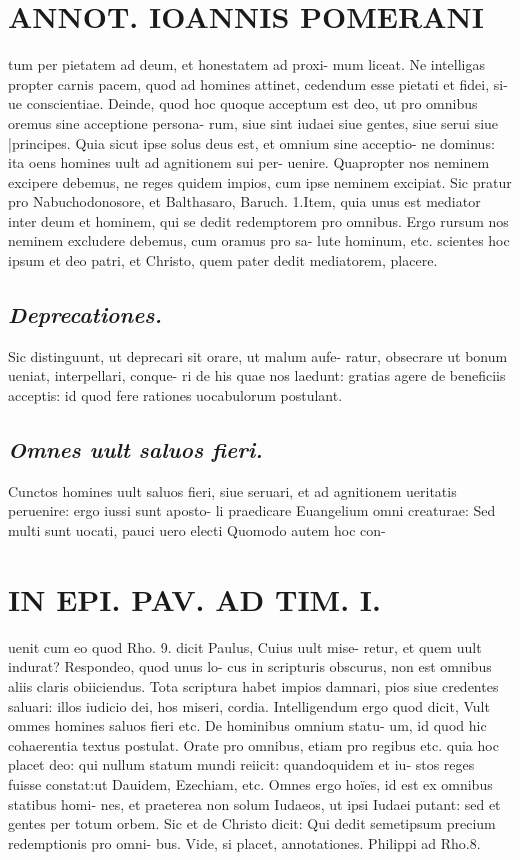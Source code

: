 \documentclass{article}
\begin{document}
\begin{pages}
\section*{ANNOT. IOANNIS POMERANI }\pstart tum per pietatem ad deum, et honestatem ad proxi- mum liceat. Ne intelligas propter carnis pacem, quod ad homines attinet, cedendum esse pietati et fidei, si- ue conscientiae. Deinde, quod hoc quoque  acceptum est deo, ut pro omnibus oremus sine acceptione persona- rum, siue sint iudaei siue gentes, siue serui siue |principes. Quia sicut ipse solus deus est, et omnium sine acceptio- ne dominus: ita oens homines uult ad agnitionem sui per- uenire. Quapropter nos neminem excipere debemus, ne reges quidem impios, cum ipse neminem excipiat. Sic pratur pro Nabuchodonosore, et Balthasaro, Baruch. 1.Item, quia unus est mediator inter deum et hominem, qui se dedit redemptorem pro omnibus. Ergo rursum nos neminem excludere debemus, cum oramus pro sa- lute hominum, etc. scientes hoc ipsum et deo patri, et Christo, quem pater dedit mediatorem, placere.  \pend
{}
{}
\subsection*{\textit{Deprecationes. }}\pstart Sic distinguunt, ut deprecari sit orare, ut malum aufe- ratur, obsecrare ut bonum ueniat, interpellari, conque- ri de his quae nos laedunt: gratias agere de beneficiis acceptis: id quod fere rationes uocabulorum postulant.  \pend
{}
{}
\subsection*{\textit{Omnes uult saluos fieri. }}\pstart Cunctos homines uult saluos fieri, siue seruari, et ad agnitionem ueritatis peruenire: ergo iussi sunt aposto- li praedicare Euangelium omni creaturae: Sed multi sunt uocati, pauci uero electi Quomodo autem hoc con-  \pend
\section*{IN EPI. PAV. AD TIM. I. }
\marginpar{[ p.84 ]}\pstart uenit cum eo quod Rho. 9. dicit Paulus, Cuius uult mise- retur, et quem uult indurat? Respondeo, quod unus lo- cus in scripturis obscurus, non est omnibus aliis claris obiiciendus. Tota scriptura habet impios damnari, pios siue credentes saluari: illos iudicio dei, hos miseri, cordia. Intelligendum ergo quod dicit, Vult ommes homines saluos fieri etc. De hominibus omnium statu- um, id quod hic cohaerentia textus postulat. Orate pro omnibus, etiam pro regibus etc. quia hoc placet deo: qui nullum statum mundi reiicit: quandoquidem et iu- stos reges fuisse constat:ut Dauidem, Ezechiam, etc. Omnes ergo hoïes, id est ex omnibus statibus homi- nes, et praeterea non solum Iudaeos, ut ipsi Iudaei putant: sed et gentes per totum orbem. Sic et de Christo dicit: Qui dedit semetipsum precium redemptionis pro omni- bus. Vide, si placet, annotationes. Philippi ad Rho.8.  \pend
{}
{}

\end{pages}
\end{document}
